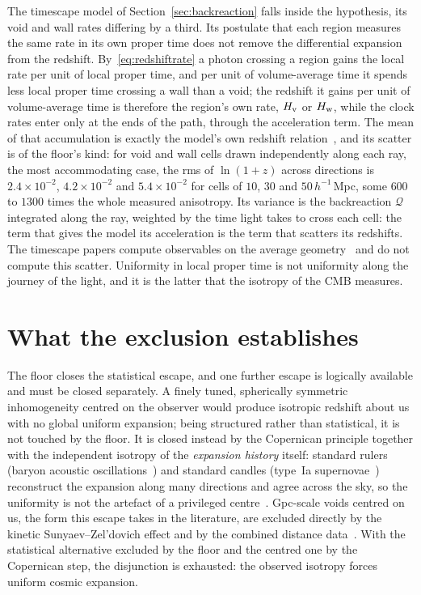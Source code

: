 \documentclass[twocolumn]{aastex701}
\begin{document}
The timescape model of Section~\ref{sec:backreaction} falls inside the hypothesis, its void and wall rates differing by a third. Its postulate that each region measures the same rate in its own proper time does not remove the differential expansion from the redshift. By~\eqref{eq:redshiftrate} a photon crossing a region gains the local rate per unit of local proper time, and per unit of volume-average time it spends less local proper time crossing a wall than a void; the redshift it gains per unit of volume-average time is therefore the region's own rate, $H_{\rm v}$ or $H_{\rm w}$, while the clock rates enter only at the ends of the path, through the acceleration term. The mean of that accumulation is exactly the model's own redshift relation~\citep[eq.~38]{Wiltshire2009}, and its scatter is of the floor's kind: for void and wall cells drawn independently along each ray, the most accommodating case, the rms of $\ln(1+z)$ across directions is $2.4\times10^{-2}$, $4.2\times10^{-2}$ and $5.4\times10^{-2}$ for cells of $10$, $30$ and $50\,h^{-1}$\,Mpc, some $600$ to $1300$ times the whole measured anisotropy. Its variance is the backreaction $\mathcal{Q}$ integrated along the ray, weighted by the time light takes to cross each cell: the term that gives the model its acceleration is the term that scatters its redshifts. The timescape papers compute observables on the average geometry~\citep{Wiltshire2009, NazerWiltshire2015, Seifert2025} and do not compute this scatter. Uniformity in local proper time is not uniformity along the journey of the light, and it is the latter that the isotropy of the CMB measures.

\section{What the exclusion establishes}\label{sec:establishes}

The floor closes the statistical escape, and one further escape is logically available and must be closed separately. A finely tuned, spherically symmetric inhomogeneity centred on the observer would produce isotropic redshift about us with no global uniform expansion; being structured rather than statistical, it is not touched by the floor. It is closed instead by the Copernican principle together with the independent isotropy of the \emph{expansion history} itself: standard rulers (baryon acoustic oscillations~\citep{Eisenstein2005}) and standard candles (type~Ia supernovae~\citep{Riess1998, Perlmutter1999}) reconstruct the expansion along many directions and agree across the sky, so the uniformity is not the artefact of a privileged centre~\citep{Barrett2000, Clarkson2010, Maartens2011}. Gpc-scale voids centred on us, the form this escape takes in the literature, are excluded directly by the kinetic Sunyaev--Zel'dovich effect and by the combined distance data~\citep{ZhangStebbins2011, Moss2011}. With the statistical alternative excluded by the floor and the centred one by the Copernican step, the disjunction is exhausted: the observed isotropy forces uniform cosmic expansion.
\end{document}
